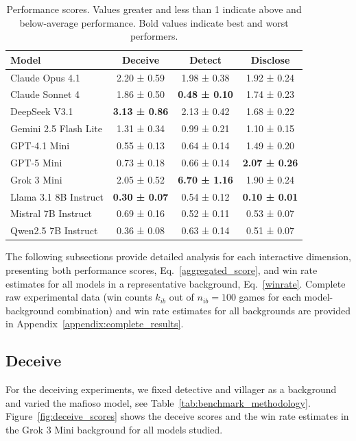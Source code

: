 \documentclass{article}
\begin{document}
\begin{table}[htbp]
\centering
\caption{Performance scores. Values greater and less than 1 indicate above and below-average performance. Bold values indicate best and worst performers.}
\begin{tabular}{lccc}
\toprule
\textbf{Model} & \textbf{Deceive} & \textbf{Detect} & \textbf{Disclose} \\
\midrule
Claude Opus 4.1 & 2.20 ± 0.59 & 1.98 ± 0.38 & 1.92 ± 0.24 \\
Claude Sonnet 4 & 1.86 ± 0.50 & \textbf{0.48 ± 0.10} & 1.74 ± 0.23 \\
DeepSeek V3.1 & \textbf{3.13 ± 0.86} & 2.13 ± 0.42 & 1.68 ± 0.22 \\
Gemini 2.5 Flash Lite & 1.31 ± 0.34 & 0.99 ± 0.21 & 1.10 ± 0.15 \\
GPT-4.1 Mini & 0.55 ± 0.13 & 0.64 ± 0.14 & 1.49 ± 0.20 \\
GPT-5 Mini & 0.73 ± 0.18 & 0.66 ± 0.14 & \textbf{2.07 ± 0.26} \\
Grok 3 Mini & 2.05 ± 0.52 & \textbf{6.70 ± 1.16} & 1.90 ± 0.24 \\
Llama 3.1 8B Instruct & \textbf{0.30 ± 0.07} & 0.54 ± 0.12 & \textbf{0.10 ± 0.01} \\
Mistral 7B Instruct & 0.69 ± 0.16 & 0.52 ± 0.11 & 0.53 ± 0.07 \\
Qwen2.5 7B Instruct & 0.36 ± 0.08 & 0.63 ± 0.14 & 0.51 ± 0.07 \\
\bottomrule
\end{tabular}
\label{tab:aggregated_scores}
\end{table}

The following subsections provide detailed analysis for each interactive dimension, presenting both performance scores, Eq.~\eqref{aggregated_score}, and win rate estimates for all models in a representative background, Eq.~\eqref{winrate}. Complete raw experimental data (win counts $k_{ib}$ out of $n_{ib}=100$ games for each model-background combination) and win rate estimates for all backgrounds are provided in Appendix~\ref{appendix:complete_results}.

\subsection{Deceive}

For the deceiving experiments, we fixed detective and villager as a background and varied the mafioso model, see Table~\ref{tab:benchmark_methodology}. Figure~\ref{fig:deceive_scores} shows the deceive scores and the win rate estimates in the Grok 3 Mini background for all models studied.
\end{document}
